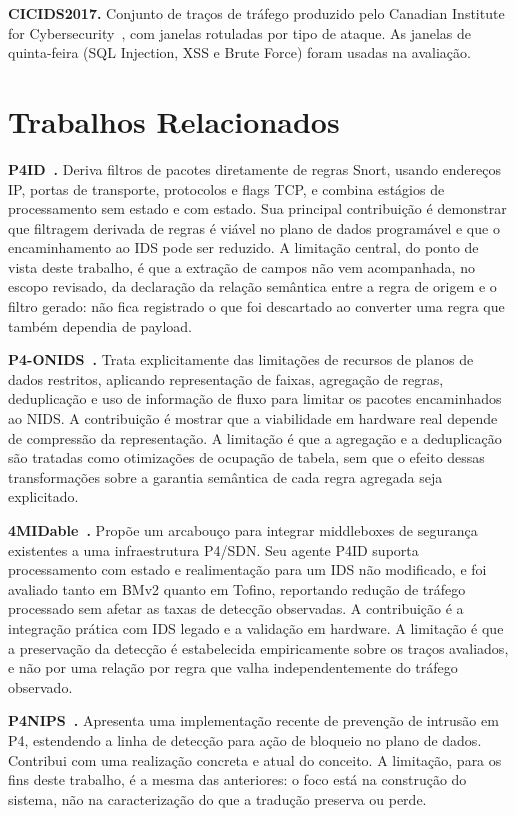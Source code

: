 \documentclass[conference]{IEEEtran}
\begin{document}
\textbf{CICIDS2017.} Conjunto de traços de tráfego produzido pelo Canadian
Institute for Cybersecurity~\cite{sharafaldin2018cicids}, com janelas
rotuladas por tipo de ataque. As janelas de quinta-feira (SQL Injection, XSS e
Brute Force) foram usadas na avaliação.

\section{Trabalhos Relacionados}

\textbf{P4ID~\cite{lewis2019p4id}.} Deriva filtros de pacotes diretamente de
regras Snort, usando endereços IP, portas de transporte, protocolos e flags
TCP, e combina estágios de processamento sem estado e com estado. Sua
principal contribuição é demonstrar que filtragem derivada de regras é viável
no plano de dados programável e que o encaminhamento ao IDS pode ser reduzido.
A limitação central, do ponto de vista deste trabalho, é que a extração de
campos não vem acompanhada, no escopo revisado, da declaração da relação
semântica entre a regra de origem e o filtro gerado: não fica registrado o que
foi descartado ao converter uma regra que também dependia de payload.

\textbf{P4-ONIDS~\cite{tavares2021p4onids}.} Trata explicitamente das
limitações de recursos de planos de dados restritos, aplicando representação
de faixas, agregação de regras, deduplicação e uso de informação de fluxo para
limitar os pacotes encaminhados ao NIDS. A contribuição é mostrar que a
viabilidade em hardware real depende de compressão da representação. A
limitação é que a agregação e a deduplicação são tratadas como otimizações de
ocupação de tabela, sem que o efeito dessas transformações sobre a garantia
semântica de cada regra agregada seja explicitado.

\textbf{4MIDable~\cite{lewis2023fourmidable}.} Propõe um arcabouço para
integrar middleboxes de segurança existentes a uma infraestrutura P4/SDN. Seu
agente P4ID suporta processamento com estado e realimentação para um IDS não
modificado, e foi avaliado tanto em BMv2 quanto em Tofino, reportando redução
de tráfego processado sem afetar as taxas de detecção observadas. A
contribuição é a integração prática com IDS legado e a validação em hardware.
A limitação é que a preservação da detecção é estabelecida empiricamente sobre
os traços avaliados, e não por uma relação por regra que valha
independentemente do tráfego observado.

\textbf{P4NIPS~\cite{senoski2025p4nips}.} Apresenta uma implementação recente
de prevenção de intrusão em P4, estendendo a linha de detecção para ação de
bloqueio no plano de dados. Contribui com uma realização concreta e atual do
conceito. A limitação, para os fins deste trabalho, é a mesma das anteriores:
o foco está na construção do sistema, não na caracterização do que a tradução
preserva ou perde.
\end{document}
